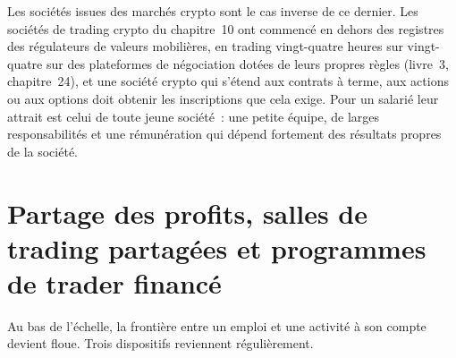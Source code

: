 Les sociétés issues des marchés crypto sont le cas inverse de ce dernier. Les sociétés de trading crypto du chapitre~10 ont commencé
en dehors des registres des régulateurs de valeurs mobilières, en trading vingt-quatre heures sur vingt-quatre sur des plateformes de négociation dotées de leurs propres règles (livre~3, chapitre~24),
et une société crypto qui s'étend aux contrats à terme,
aux actions ou aux options doit obtenir les inscriptions que cela exige. Pour un salarié
leur attrait est celui de toute jeune société~: une petite équipe, de larges responsabilités et une rémunération qui dépend fortement des
résultats propres de la société.

\begin{omfigure}

\label{fig:in:medium-frequency-proprietary-shops:flows}
\end{omfigure}

\section{Partage des profits, salles de trading partagées et programmes de trader financé}

Au bas de l'échelle, la frontière entre un emploi et une activité à son compte devient floue. Trois dispositifs reviennent régulièrement.

